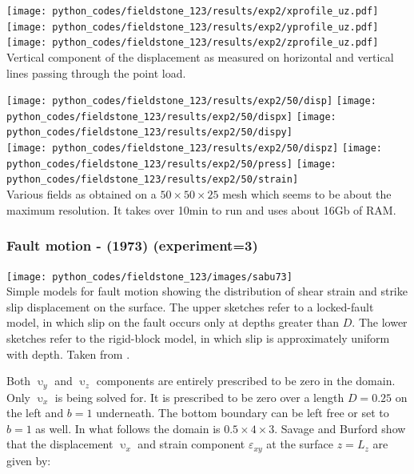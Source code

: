 \begin{center}
\texttt{[image: python\_codes/fieldstone\_123/results/exp2/xprofile\_uz.pdf]}
\texttt{[image: python\_codes/fieldstone\_123/results/exp2/yprofile\_uz.pdf]}
\texttt{[image: python\_codes/fieldstone\_123/results/exp2/zprofile\_uz.pdf]}\\
{\captionfont Vertical component of the displacement as measured on horizontal and 
vertical lines passing through the point load.}
\end{center}



\begin{center}
\texttt{[image: python\_codes/fieldstone\_123/results/exp2/50/disp]} 
\texttt{[image: python\_codes/fieldstone\_123/results/exp2/50/dispx]} 
\texttt{[image: python\_codes/fieldstone\_123/results/exp2/50/dispy]} \\
\texttt{[image: python\_codes/fieldstone\_123/results/exp2/50/dispz]} 
\texttt{[image: python\_codes/fieldstone\_123/results/exp2/50/press]} 
\texttt{[image: python\_codes/fieldstone\_123/results/exp2/50/strain]}\\ 
{\captionfont Various fields as obtained on a $50\times 50 \times25$ mesh
which seems to be about the maximum resolution. It takes over 10min to run and uses about 16Gb of RAM.}
\end{center}

\subsubsection*{Fault motion - \textcite{sabu73} (1973) (experiment=3)}


\begin{center}
\texttt{[image: python\_codes/fieldstone\_123/images/sabu73]}\\
{\captionfont  Simple models for fault motion showing the distribution of shear 
strain and strike slip displacement on the surface. The upper sketches refer to 
a locked-fault model, in which slip on the fault occurs only at depths greater than $D$. 
The lower sketches refer to the rigid-block model, in which slip is approximately uniform with depth.
Taken from \textcite{sabu73}.}
\end{center}

Both $\upupsilon_y$ and $\upupsilon_z$ 
components are entirely prescribed to be zero in the domain. 
Only $\upupsilon_x$ is being solved for. It is prescribed to be zero 
over a length $D=0.25$ on the left and $b=1$ underneath. 
The bottom boundary can be left free or set to $b=1$ as well.
In what follows the domain is $0.5\times 4\times 3$.
Savage and Burford \cite{sabu73} show that the displacement $\upupsilon_x$ 
and strain component ${\varepsilon}_{xy}$ at the surface $z=L_z$ are given by:

